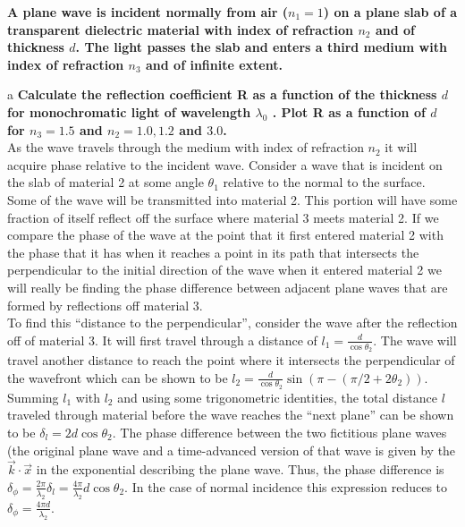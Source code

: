 \begin{homeworkProblem}
\textbf{A plane wave is incident normally from air ($n_1 =1$) on a plane slab of a transparent dielectric material with index of refraction $n_2$ and of thickness $d$. The light passes the slab and enters a third
medium with index of refraction $n_3$ and of infinite extent.}
\begin{homeworkSection}{a}
\textbf{Calculate the reflection coefficient R as a function of the thickness $d$ for monochromatic light of
wavelength $\lambda_0$ . Plot R as a function of $d$ for $n_3 =1.5$ and $n_2 =1.0, 1.2$ and  $3.0$.}
\\

As the wave travels through the medium with index of refraction $n_2$ it will acquire phase 
relative to the incident wave. Consider a wave that is incident on the slab of material 2 
at some angle $\theta_1$ relative to the normal to the surface. Some of the wave will be transmitted into material 2. This portion will have some fraction of itself reflect off the surface where 
material 3 meets material 2. If we compare the phase of the wave at the point that it 
first entered material 2 with the phase that it has when it reaches a point in its path that 
intersects the perpendicular to the initial direction of the wave when it entered material 
2 we will really be finding the phase difference between adjacent plane waves that are 
formed by reflections off material 3.
\\

To find this ``distance to the perpendicular'', consider the wave after the reflection off of 
material 3. It will first travel through 
a distance of $l_1 = \frac{d}{\cos\theta_2}$. The wave will travel another distance to reach the point where it intersects the perpendicular of the wavefront which can be shown to be 
$l_2 = \frac{d}{\cos\theta_2}\sin(\pi-(\pi/2+2\theta_2))$. Summing $l_1$ with $l_2$ and using 
some trigonometric identities, the total distance $l$ traveled through material before the 
wave reaches the ``next plane'' can be shown to be $\delta_l = 2d\cos\theta_2$. The phase 
difference between the two fictitious plane waves (the original plane wave and a time-advanced 
version of that wave is given by the $\vec{k}\cdot\vec{x}$ in the exponential describing the 
plane wave. Thus, the phase difference is $\delta_{\phi} = \frac{2\pi}{\lambda_2}\delta_l = 
\frac{4\pi}{\lambda_2}d \cos\theta_2$. In the case of normal incidence this expression 
reduces to $\delta_{\phi} = \frac{4\pi d}{\lambda_2}$.
\\


\end{homeworkSection}
\end{homeworkProblem}
